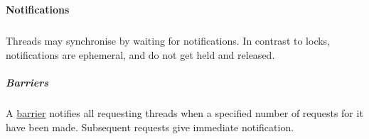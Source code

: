 \paragraph*{Notifications}\hypertarget{notifications}{}\label{notifications}

\begin{align*}
  [ ~ 
  \textsf{Barriers
          } ~ & \textsf{} \\
  \KEY{Funcon} ~ & \NAMEREF{barrier-create} \\
  \KEY{Funcon} ~ & \NAMEREF{barrier-sync} \\
  \KEY{Funcon} ~ & \NAMEREF{barrier-sync-else-wait} \\
  \textsf{Conditions
          } ~ & \textsf{} \\
  \KEY{Funcon} ~ & \NAMEREF{condition-create} \\
  \KEY{Funcon} ~ & \NAMEREF{condition-wait} \\
  \KEY{Funcon} ~ & \NAMEREF{condition-wait-with-lock} \\
  \KEY{Funcon} ~ & \NAMEREF{condition-notify-all} \\
  \KEY{Funcon} ~ & \NAMEREF{condition-notify-first} \\
  \textsf{Rendezvous
          } ~ & \textsf{} \\
  \KEY{Funcon} ~ & \NAMEREF{rendezvous-create} \\
  \KEY{Funcon} ~ & \NAMEREF{rendezvous-sync} \\
  \KEY{Funcon} ~ & \NAMEREF{rendezvous-sync-else-wait}
  ~ ]
\end{align*}
Threads may synchronise by waiting for notifications. In contrast to locks,
notifications are ephemeral, and do not get held and released.

\subparagraph*{Barriers}\hypertarget{barriers}{}\label{barriers}

A \href{https://en.wikipedia.org/wiki/Barrier_(computer_science)}{barrier} notifies all requesting threads when a specified number of requests
for it have been made. Subsequent requests give immediate notification.

